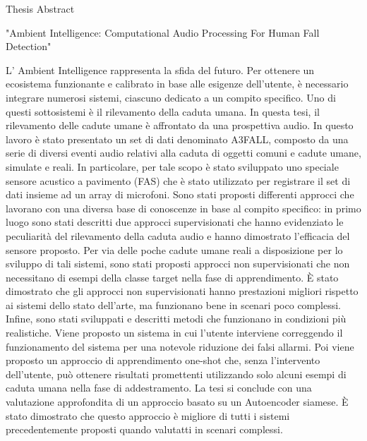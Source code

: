 \documentclass[]{letter}
\begin{document}
	
	\begin{letter}{Thesis Abstract}
		\opening{"Ambient Intelligence:
Computational Audio Processing
For Human Fall Detection"}
		
	L' Ambient Intelligence rappresenta la sfida del futuro. Per ottenere un ecosistema funzionante e calibrato in base alle esigenze dell'utente, è necessario integrare numerosi sistemi, ciascuno dedicato a un compito specifico. Uno di questi sottosistemi è il rilevamento della caduta umana. In questa tesi, il rilevamento delle cadute umane è affrontato da una prospettiva audio. In questo lavoro è stato presentato un set di dati denominato A3FALL, composto da una serie di diversi eventi audio relativi alla caduta di oggetti comuni e cadute umane, simulate e reali. In particolare, per tale scopo è stato sviluppato uno speciale sensore acustico a pavimento (FAS) che è stato utilizzato per registrare il set di dati insieme ad un array di microfoni.
	Sono stati proposti differenti approcci che lavorano con una diversa base di conoscenze in base al compito specifico: in primo luogo sono stati descritti due approcci supervisionati che hanno evidenziato le peculiarità del rilevamento della caduta audio e hanno dimostrato l'efficacia del sensore proposto.
	Per via delle poche cadute umane reali a disposizione per lo sviluppo di tali sistemi, sono stati proposti approcci non supervisionati che non necessitano di esempi della classe target nella fase di apprendimento. È stato dimostrato che gli approcci non supervisionati hanno prestazioni migliori rispetto ai sistemi dello stato dell'arte, ma funzionano bene in scenari poco complessi.
	Infine, sono stati sviluppati e descritti metodi che funzionano in condizioni più realistiche. Viene proposto un sistema in cui l'utente interviene correggendo il funzionamento del sistema per una notevole riduzione dei falsi allarmi. Poi viene proposto un approccio di apprendimento one-shot che, senza l'intervento dell'utente, può ottenere risultati promettenti utilizzando solo alcuni esempi di caduta umana nella fase di addestramento. La tesi si conclude con una valutazione approfondita di un approccio basato su un Autoencoder siamese. È stato dimostrato che questo approccio è migliore di tutti i sistemi precedentemente proposti quando valutatti in  scenari complessi.
		
		
		\signature{Fabio Vesperini}
		
		
		
	\end{letter}
\end{document}
